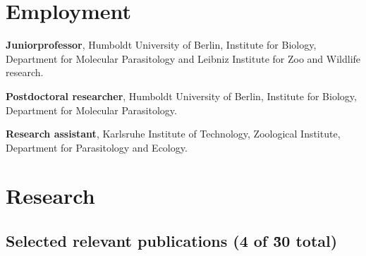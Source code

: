 \documentclass[10pt,a4paper]{article}
\renewenvironment{itemize}{
  \begin{list}{}{
    \setlength{\leftmargin}{2.5em}
    \setlength{\itemsep}{0.25em}
    \setlength{\parskip}{0pt}
    \setlength{\parsep}{0.25em}
  }
}{
  \end{list}
}
\begin{document}
\section*{Employment}

\begin{itemize}
\item [2014 -- present] \textbf{Juniorprofessor}, Humboldt
  University of Berlin, Institute for Biology, Department for
  Molecular Parasitology and Leibniz Institute for Zoo and Wildlife
  research.
\item [2012 -- 2014] \textbf{Postdoctoral researcher},
  Humboldt University of Berlin, Institute for Biology, Department for
  Molecular Parasitology.
\item [2008 -- 2011] \textbf{Research assistant}, Karlsruhe
  Institute of Technology, Zoological Institute, Department for
  Parasitology and Ecology.
\end{itemize}



\section*{Research}

\subsection*{Selected relevant publications (4 of \~30 total)}
\end{document}
